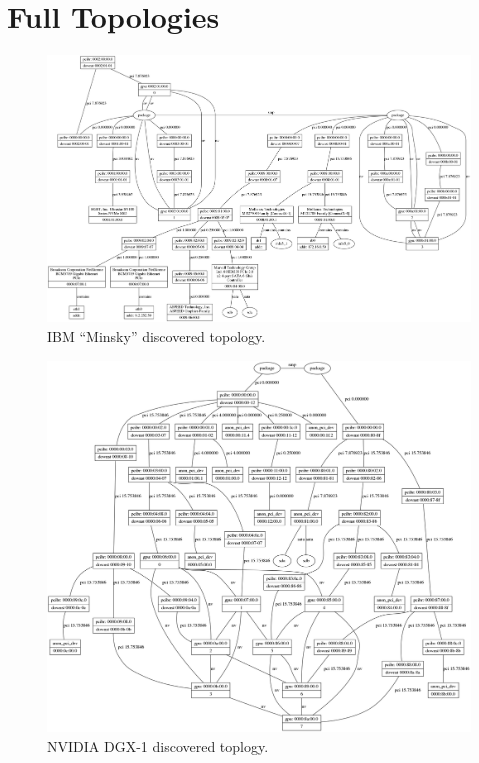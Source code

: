 \chapter{Full Topologies}
\label{ch:full-topos}

\begin{figure}[ht]
    \centering
    \includegraphics[width=\textwidth]{figures/topo-minsky-actual.png}
    \caption{IBM ``Minsky'' discovered topology.}
    \label{fig:topo-minsky-actual}
\end{figure}

\begin{figure}[ht]
    \centering
    \includegraphics[width=\textwidth]{figures/topo-dgx1-actual.png}
    \caption{NVIDIA DGX-1 discovered toplogy.}
    \label{fig:topo-dgx-actual}
\end{figure}